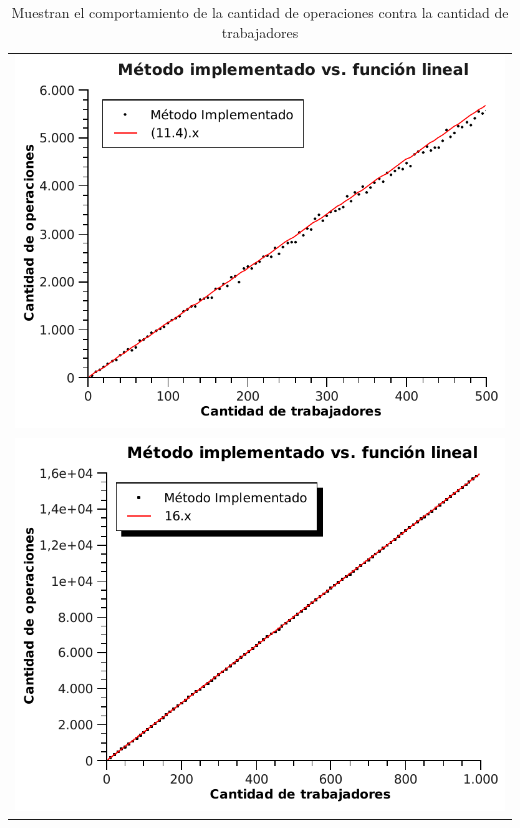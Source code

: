 \begin{table}[ht] %
\centering %
\begin{tabular}{c}
\includegraphics[scale=0.7]{../ej3/graficos/contarOp1.pdf} \\
\includegraphics[scale=0.7]{../ej3/graficos/contarOp5.pdf}
\end{tabular}

\caption{Muestran el comportamiento de la cantidad de operaciones contra la cantidad de trabajadores} %
\label{cantOp} %
\end{table}


